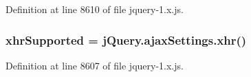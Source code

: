 Definition at line 8610 of file jquery-\/1.\+x.\+js.

\subsubsection[{\texorpdfstring{xhr\+Supported}{xhrSupported}}]{\setlength{\rightskip}{0pt plus 5cm}xhr\+Supported = {\bf j\+Query.\+ajax\+Settings.\+xhr}()}\hypertarget{jquery-1_8x_8js_afd7e72f2f357a5a8b17e46776a6283eb}{}\label{jquery-1_8x_8js_afd7e72f2f357a5a8b17e46776a6283eb}


Definition at line 8607 of file jquery-\/1.\+x.\+js.

